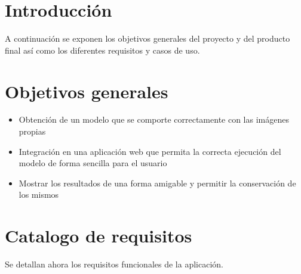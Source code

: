 
\section{Introducción}
A continuación se exponen los objetivos generales del proyecto y del producto final así como los diferentes requisitos y casos de uso.

\section{Objetivos generales}

\begin{itemize}
    \item Obtención de un modelo que se comporte correctamente con las imágenes propias
    \item Integración en una aplicación web que permita la correcta ejecución del modelo de forma sencilla para el usuario
    \item Mostrar los resultados de una forma amigable y permitir la conservación de los mismos
\end{itemize}

\section{Catalogo de requisitos}
Se detallan ahora los requisitos funcionales de la aplicación.


